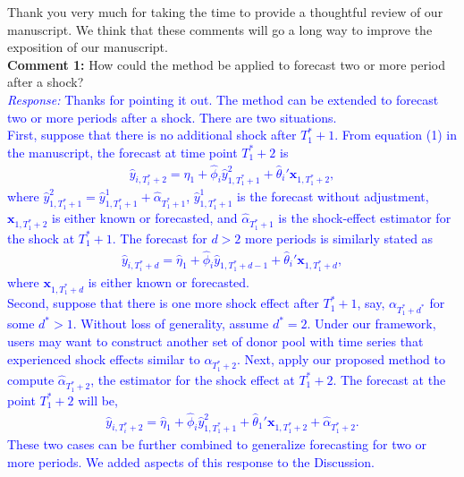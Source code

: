 \documentclass[12pt]{article}
\newcommand{\response}[1]{\noindent \textcolor{blue}{\emph{Response:} #1}}
\begin{document}
Thank you very much for taking the time to provide a thoughtful review of our manuscript. We think that these comments will go a long way to improve the exposition of our manuscript. \\


{\bf  Comment 1:} How could the method be applied to forecast two or more period after a shock? \\

\response{Thanks for pointing it out. The method can be extended to forecast two or more periods after a shock. There are two situations.  \\

First, suppose that there is no additional shock after $T_1^* + 1$. From equation (1) in the manuscript, the forecast at time point $T_1^*+2$ is
\begin{align*}
 \hat{y}_{i, T_i^* + 2} = \hat{\eta}_1 + \hat{\phi}_i \hat{y}_{1, T_1^*+1}^{2} + \hat{\theta}_i'\mathbf{x}_{1, T_1^*+2}, \tag{*}
\end{align*}
where $\hat{y}_{1, T_1^*+1}^{2}=\hat{y}_{1, T_1^*+1}^{1} + \hat{\alpha}_{T_1^* + 1}$, $\hat{y}_{1, T_1^*+1}^{1}$ is the forecast without adjustment, $\mathbf{x}_{1, T_1^*+2}$ is either known or forecasted, and  $\hat{\alpha}_{T_1^* + 1}$ is the shock-effect estimator for the shock at $T_1^*+1$. The forecast for $d>2$ more periods is similarly stated as
\begin{align*}
 \hat{y}_{i, T_i^* + d} = \hat{\eta}_1 + \hat{\phi}_i \hat{y}_{1, T_1^*+d-1}+ \hat{\theta}_i'\mathbf{x}_{1, T_1^*+d},
\end{align*}
where $\mathbf{x}_{1, T_1^*+d}$ is either known or forecasted. \\

Second, suppose that  there is one more shock effect after $T_1^*+1$, say, $\alpha_{T_1^* + d^*}$ for some $d^* > 1$. Without loss of generality, assume $d^* = 2$. Under our framework, users may want to construct another set of donor pool with time series that experienced shock effects similar to $\alpha_{T_1^* + 2}$. Next,  apply our proposed method to compute $\hat{\alpha}_{T_1^* + 2}$, the estimator for the shock effect at $T_1^* +2$. The forecast at the point $T_1^* + 2$ will be,  
\begin{align*}
 \hat{y}_{i, T_i^* + 2} = \hat{\eta}_1 + \hat{\phi}_i \hat{y}_{1, T_1^*+1}^{2} + \hat{\theta}_1'\mathbf{x}_{1, T_1^*+2} + \hat{\alpha}_{T_1^* + 2}.
\end{align*}
These two cases can be further combined to generalize forecasting for two or more periods. We added aspects of this response to the Discussion.\\
}
\end{document}
